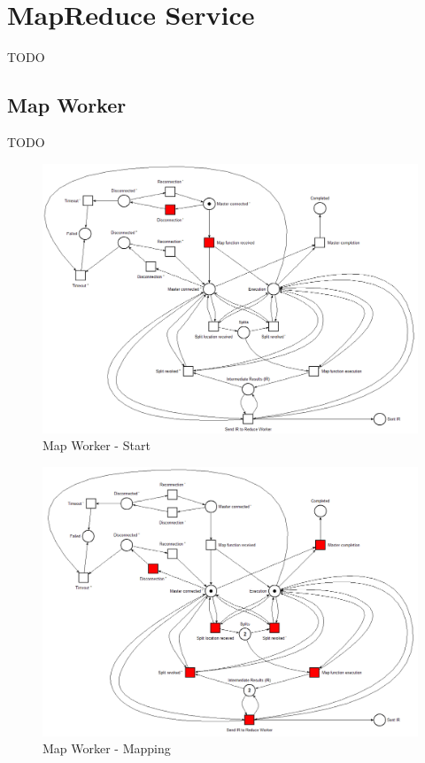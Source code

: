 \section{MapReduce Service}
TODO

\subsection{Map Worker}
TODO

\begin{figure}[!ht]
    \centering
    \includegraphics[width=\linewidth]{document/chapters/chapter_6/images/map_worker_petri_net_1.png}
    \caption{Map Worker - Start}
    \label{fig:map_worker_petri_net_1}
\end{figure}

\begin{figure}[!ht]
    \centering
    \includegraphics[width=\linewidth]{document/chapters/chapter_6/images/map_worker_petri_net_2.png}
    \caption{Map Worker - Mapping}
    \label{fig:map_worker_petri_net_2}
\end{figure}

